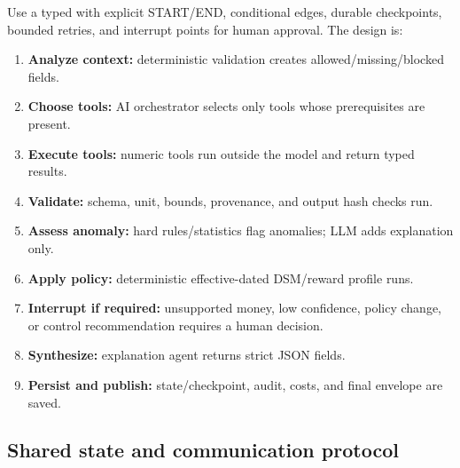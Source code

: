Use a typed  with explicit START/END, conditional edges, durable checkpoints,
bounded retries, and interrupt points for human approval. The design is:

\begin{enumerate}
  \item \textbf{Analyze context:} deterministic validation creates allowed/missing/blocked fields.
  \item \textbf{Choose tools:} AI orchestrator selects only tools whose prerequisites are present.
  \item \textbf{Execute tools:} numeric tools run outside the model and return typed results.
  \item \textbf{Validate:} schema, unit, bounds, provenance, and output hash checks run.
  \item \textbf{Assess anomaly:} hard rules/statistics flag anomalies; LLM adds explanation only.
  \item \textbf{Apply policy:} deterministic effective-dated DSM/reward profile runs.
  \item \textbf{Interrupt if required:} unsupported money, low confidence, policy change, or control
        recommendation requires a human decision.
  \item \textbf{Synthesize:} explanation agent returns strict JSON fields.
  \item \textbf{Persist and publish:} state/checkpoint, audit, costs, and final envelope are saved.
\end{enumerate}

\subsection{Shared state and communication protocol}

